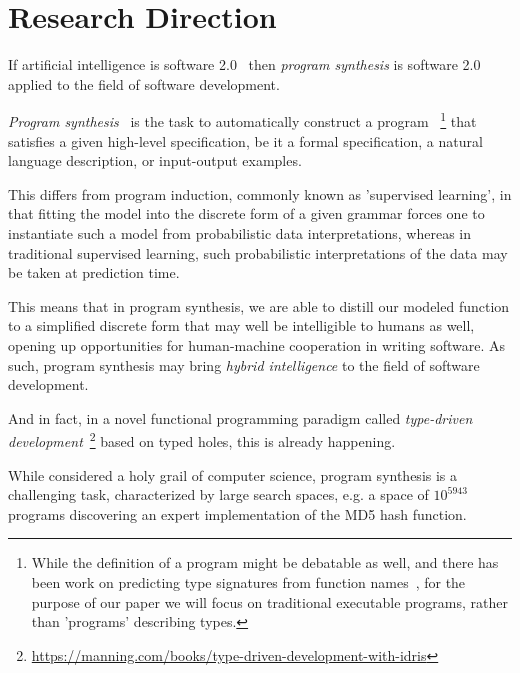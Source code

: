 \documentclass{article}
\begin{document}


\section{Research Direction}

If artificial intelligence is software 2.0~\citep{software20}
then \emph{program synthesis} is software 2.0 applied to the field of software development.

\emph{Program synthesis}~\citep{church1957applications} is the task to automatically construct a program%
~\footnote{While the definition of a program might be debatable as well, and there has been work on predicting type signatures from function names~\citep{wang2018predicting}, for the purpose of our paper we will focus on traditional executable programs, rather than 'programs' describing types.}%
that satisfies a given high-level specification,
be it a formal specification, a natural language description, or input-output examples.

This differs from program induction, commonly known as 'supervised learning',
in that fitting the model into the discrete form of a given grammar
forces one to instantiate such a model from probabilistic data interpretations,
whereas in traditional supervised learning,
such probabilistic interpretations of the data may be taken at prediction time.

This means that in program synthesis, we are able to distill our modeled function
to a simplified discrete form that may well be intelligible to humans as well,
opening up opportunities for human-machine cooperation in writing software.
As such, program synthesis may bring \emph{hybrid intelligence} to the field of software development.

And in fact, in a novel functional programming paradigm called
\emph{type-driven development}~\footnote{\url{https://manning.com/books/type-driven-development-with-idris}}
based on typed holes, this is already happening.

While considered a holy grail of computer science, program synthesis is a challenging task, characterized by large search spaces,
e.g. a space of $10^{5943}$ programs discovering an expert implementation of the MD5 hash function.~\cite{gulwani2017program}
\end{document}
